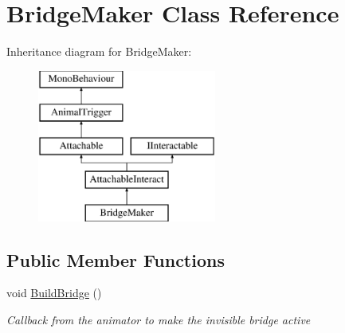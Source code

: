 \hypertarget{class_bridge_maker}{}\section{Bridge\+Maker Class Reference}
\label{class_bridge_maker}
Inheritance diagram for Bridge\+Maker\+:\begin{figure}[H]
\begin{center}
\leavevmode
\includegraphics[height=5.000000cm]{class_bridge_maker}
\end{center}
\end{figure}
\subsection*{Public Member Functions}
\begin{DoxyCompactItemize}
\item 
void \mbox{\hyperlink{class_bridge_maker_a9f0d946af5000826f91a6f7d0e361d63}{Build\+Bridge}} ()
\begin{DoxyCompactList}\small\item\em Callback from the animator to make the invisible bridge active \end{DoxyCompactList}\end{DoxyCompactItemize}

